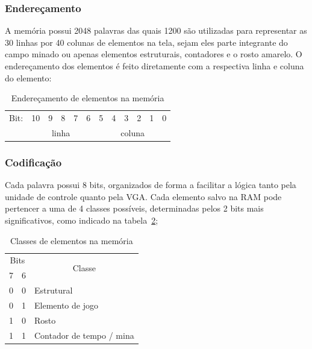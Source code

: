 \documentclass[12pt]{article}
\begin{document}
\subsubsection{Endereçamento}
\label{sec:ramaddr}

A memória possui 2048 palavras das quais 1200 são utilizadas para representar
as 30 linhas por 40 colunas de elementos na tela, sejam eles parte integrante
do campo minado ou apenas elementos estruturais, contadores e o rosto amarelo.
O endereçamento dos elementos é feito diretamente com a respectiva linha e 
coluna do elemento: 

\begin{table}[ht!]
\centering
\begin{tabular}{l|c|c|c|c|c|c|c|c|c|c|c|}
\cline{2-12}
Bit: & 10 & 9 & 8 & 7 & 6 & 5 & 4 & 3 & 2 & 1 & 0 \\
\cline{2-12}
 & \multicolumn{5}{c|}{linha} & \multicolumn{6}{c|}{coluna}\\
\cline{2-12}
\end{tabular}
\caption{Endereçamento de elementos na memória}
\label{tab:ramaddr}
\end{table}

\subsubsection{Codificação}
\label{sec:ramenc}

Cada palavra possui 8 bits, organizados de forma a facilitar a lógica tanto
pela unidade de controle quanto pela VGA. Cada elemento salvo na RAM pode
pertencer a uma de 4 classes possíveis, determinadas pelos 2 bits mais
significativos, como indicado na tabela~\ref{tab:rammsb};

\begin{table}[ht!]
\centering
\begin{tabular}{|c|c|c|}
\hline
\multicolumn{2}{|c|}{Bits} & \multirow{2}{*}{Classe} \\
\cline{1-2}
7 & 6 & \\
\hline
0 & 0 & \multicolumn{1}{|l|}{Estrutural} \\
0 & 1 & \multicolumn{1}{|l|}{Elemento de jogo} \\
1 & 0 & \multicolumn{1}{|l|}{Rosto} \\
1 & 1 & \multicolumn{1}{|l|}{Contador de tempo / mina} \\
\hline
\end{tabular}
\caption{Classes de elementos na memória}
\label{tab:rammsb}
\end{table}
\end{document}
